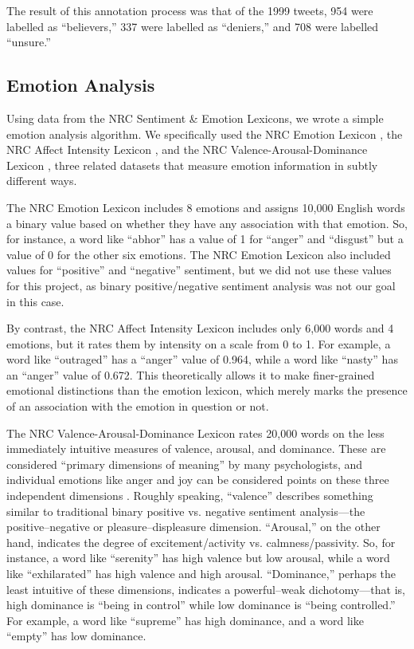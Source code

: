 \documentclass[article,oneside,a4paper,12pt]{memoir}
\begin{document}
The result of this annotation process was that of the 1999 tweets, 954 were labelled as ``believers,'' 337 were labelled as ``deniers,'' and 708 were labelled ``unsure.''

\subsection{Emotion Analysis}\label{emocode}

Using data from the NRC Sentiment \& Emotion Lexicons, we wrote a simple emotion analysis algorithm. We specifically used the NRC Emotion Lexicon \parencite{nrc-emo}, the NRC Affect Intensity Lexicon \parencite{nrc-affect}, and the NRC Valence-Arousal-Dominance Lexicon \parencite{nrc-vad}, three related datasets that measure emotion information in subtly different ways. 

The NRC Emotion Lexicon includes 8 emotions and assigns 10,000 English words a binary value based on whether they have any association with that emotion. So, for instance, a word like ``abhor'' has a value of 1 for ``anger'' and ``disgust'' but a value of 0 for the other six emotions. The NRC Emotion Lexicon also included values for ``positive'' and ``negative'' sentiment, but we did not use these values for this project, as binary positive/negative sentiment analysis was not our goal in this case.

By contrast, the NRC Affect Intensity Lexicon includes only 6,000 words and 4 emotions, but it rates them by intensity on a scale from 0 to 1. For example, a word like ``outraged'' has a ``anger'' value of 0.964, while a word like ``nasty'' has an ``anger'' value of 0.672. This theoretically allows it to make finer-grained emotional distinctions than the emotion lexicon, which merely marks the presence of an association with the emotion in question or not.

The NRC Valence-Arousal-Dominance Lexicon rates 20,000 words on the less immediately intuitive measures of valence, arousal, and dominance. These are considered ``primary dimensions of meaning'' by many psychologists, and individual emotions like anger and joy can be considered points on these three independent dimensions \parencite{osgood1957measurement,russell1980circumplex,russell_core_2003,bakker2014pleasure}. Roughly speaking, ``valence'' describes something similar to traditional binary positive vs. negative sentiment analysis---the positive--negative or pleasure--displeasure dimension. ``Arousal,'' on the other hand, indicates the degree of excitement/activity vs. calmness/passivity. So, for instance, a word like ``serenity'' has high valence but low arousal, while a word like ``exhilarated'' has high valence and high arousal. ``Dominance,'' perhaps the least intuitive of these dimensions, indicates a powerful--weak dichotomy---that is, high dominance is ``being in control'' while low dominance is ``being controlled.'' For example, a word like ``supreme'' has high dominance, and a word like ``empty'' has low dominance.
\end{document}
